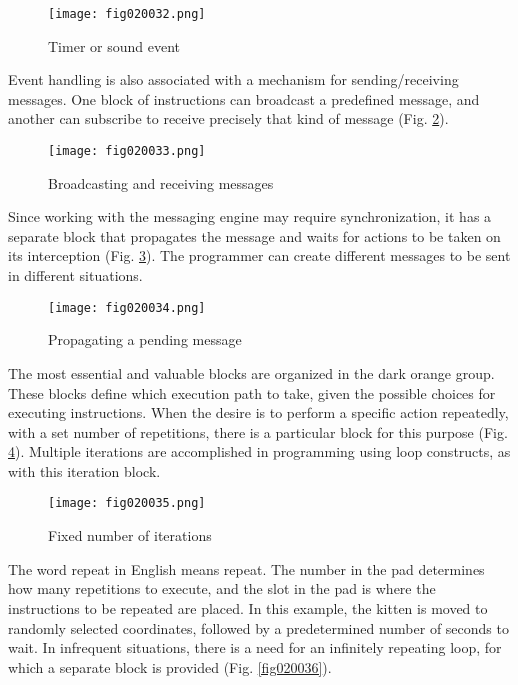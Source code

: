 \begin{figure}[H]
   \centering
   \texttt{[image: fig020032.png]}
   \caption{Timer or sound event}
\label{fig020032}
\end{figure}

Event handling is also associated with a mechanism for sending/receiving messages. One block of instructions can broadcast a predefined message, and another can subscribe to receive precisely that kind of message (Fig. \ref{fig020033}).

\begin{figure}[H]
   \centering
   \texttt{[image: fig020033.png]}
   \caption{Broadcasting and receiving messages}
\label{fig020033}
\end{figure}

Since working with the messaging engine may require synchronization, it has a separate block that propagates the message and waits for actions to be taken on its interception (Fig. \ref{fig020034}). The programmer can create different messages to be sent in different situations.

\begin{figure}[H]
   \centering
   \texttt{[image: fig020034.png]}
   \caption{Propagating a pending message}
\label{fig020034}
\end{figure}

The most essential and valuable blocks are organized in the dark orange group. These blocks define which execution path to take, given the possible choices for executing instructions. When the desire is to perform a specific action repeatedly, with a set number of repetitions, there is a particular block for this purpose (Fig. \ref{fig020035}). Multiple iterations are accomplished in programming using loop constructs, as with this iteration block.

\begin{figure}[H]
   \centering
   \texttt{[image: fig020035.png]}
   \caption{Fixed number of iterations}
\label{fig020035}
\end{figure}

The word repeat in English means repeat. The number in the pad determines how many repetitions to execute, and the slot in the pad is where the instructions to be repeated are placed. In this example, the kitten is moved to randomly selected coordinates, followed by a predetermined number of seconds to wait. In infrequent situations, there is a need for an infinitely repeating loop, for which a separate block is provided (Fig. \ref{fig020036}).

